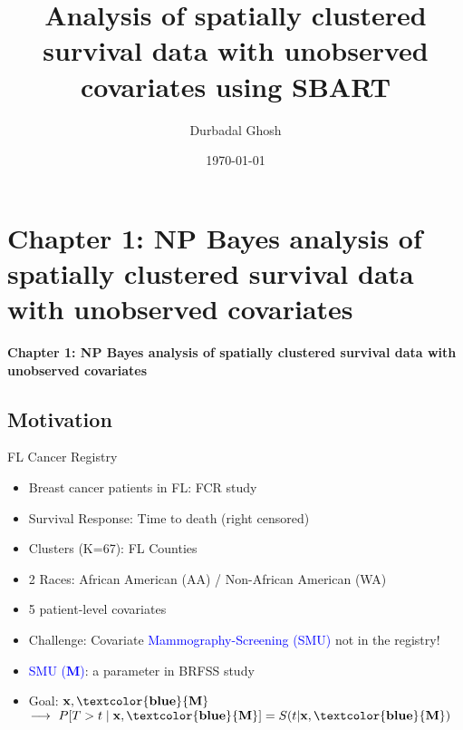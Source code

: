 \documentclass{beamer}
\title{Analysis of spatially clustered survival data with unobserved covariates using SBART}
\author{Durbadal Ghosh}
\date{\today}
\begin{document}
\begin{frame}
  \titlepage
\end{frame}
\begin{frame}
  \tableofcontents
\end{frame}






\section{Chapter 1: NP Bayes analysis of spatially clustered survival data with unobserved covariates}
\begin{frame}{}
    \centering
    \textbf{Chapter 1: NP Bayes analysis of spatially clustered survival data with unobserved covariates}
\end{frame}
\subsection{Motivation}

\begin{frame}{FL Cancer Registry}
\protect\hypertarget{motivating-dataset}{}
\begin{itemize}
\vfill \item
  Breast cancer patients in FL: FCR study
\vfill \item
  Survival Response: Time to death (right censored)
\vfill \item
   Clusters (K=67): FL Counties
\vfill \item 2 Races: African American (AA) / Non-African American (WA)
\vfill \item
  5 patient-level covariates
\pause
\vfill \item Challenge: Covariate \textcolor{blue}{Mammography-Screening (SMU)} not in the registry!
\pause
\vfill \item \textcolor{blue}{SMU ($\mathbf{M}$)}: a parameter in BRFSS study

\vfill \item Goal: $\mathbf{x, \textcolor{blue}{M}}$ $\longrightarrow\ P[T>t\mid \mathbf{x, \textcolor{blue}{M}}]=S(t|\mathbf{x, \textcolor{blue}{M}})$
\end{itemize}
\end{frame}
\end{document}
